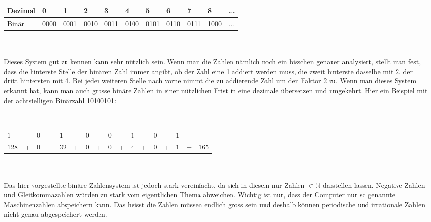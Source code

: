 \\


\begin{tabular}{l|l|l|l|l|l|l|l|l|l|l}


Dezimal & 0 & 1 & 2 & 3 & 4 & 5 & 6 & 7 & 8 &  ...\\ \hline


Binär & 0000 & 0001 & 0010 & 0011 & 0100 & 0101 & 0110 & 0111 & 1000 & ...\\


\end{tabular}  \\


\\


Dieses System gut zu kennen kann sehr nützlich sein. Wenn man die Zahlen nämlich noch ein bisschen genauer analysiert, stellt man fest, dass  die hinterste Stelle der binären Zahl immer angibt, ob der Zahl eine 1 addiert werden muss, die zweit hinterste dasselbe mit 2, der dritt hintersten mit 4. Bei jeder weiteren Stelle nach vorne nimmt die zu addierende Zahl um den Faktor 2 zu. Wenn man dieses System erkannt hat, kann man auch grosse binäre Zahlen in einer nützlichen Frist in eine dezimale übersetzen und umgekehrt. Hier ein Beispiel mit der achtstelligen Binärzahl 10100101:


\\


\begin{tabular}{l l l l l l l l l l l l l l l l l}


$1$ & & $0$ & &  $1$ & & $0$ & & $0$ & & $1$ & & $0$ & & $1$ & & \\


$ 128 $ &+& $0$ &+& $ 32$ &+& $0$ &+& $0$ &+& $ 4$ &+& $0$ &+& $1$ &=& $165$ \\


\end{tabular} \\


\\


Das hier vorgestellte binäre Zahlensystem ist jedoch stark vereinfacht, da sich in diesem nur Zahlen $\in \mathbb{N} $ darstellen lassen. Negative Zahlen und Gleitkommazahlen würden zu stark vom eigentlichen Thema abweichen. Wichtig ist nur, dass der Computer nur so genannte Maschinenzahlen abspeichern kann. Das heisst die Zahlen müssen endlich gross sein und deshalb können periodische und irrationale Zahlen nicht genau abgespeichert werden.


